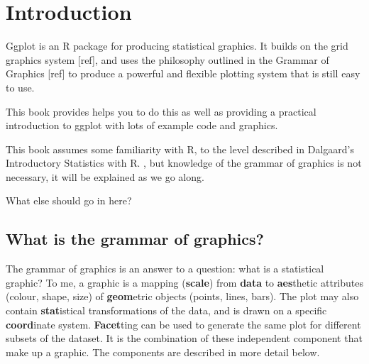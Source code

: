 



\chapter{Introduction}

Ggplot is an R package for producing statistical graphics.  It builds on the grid graphics system [ref], and uses the philosophy outlined in the Grammar of Graphics [ref] to produce a powerful and flexible plotting system that is still easy to use.  


This book provides helps you to do this as well as providing a practical introduction to ggplot with lots of example code and graphics.

This book assumes some familiarity with R, to the level described in Dalgaard’s Introductory Statistics with R.  , but knowledge of the grammar of graphics is not necessary, it will be explained as we go along.

What else should go in here?

% 
% 

\section{What is the grammar of graphics?}

The grammar of graphics is an answer to a question: what is a statistical graphic?  To me, a graphic is a mapping  ({\bf scale})  from {\bf data} to {\bf aes}thetic attributes (colour, shape, size) of {\bf geom}etric objects (points, lines, bars).  The plot may also contain {\bf stat}istical transformations of the data, and is drawn on a specific {\bf coord}inate system.  {\bf Facet}ting can be used to generate the same plot for different subsets of the dataset.  It is the combination of these independent component that make up a graphic.  The components are described in more detail below.

